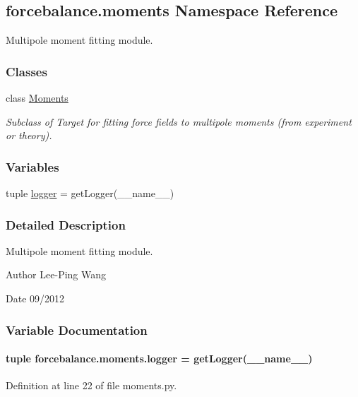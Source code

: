 \hypertarget{namespaceforcebalance_1_1moments}{\subsection{forcebalance.\-moments Namespace Reference}
\label{namespaceforcebalance_1_1moments}
}


Multipole moment fitting module.  


\subsubsection*{Classes}
\begin{DoxyCompactItemize}
\item 
class \hyperlink{classforcebalance_1_1moments_1_1Moments}{Moments}
\begin{DoxyCompactList}\small\item\em Subclass of Target for fitting force fields to multipole moments (from experiment or theory). \end{DoxyCompactList}\end{DoxyCompactItemize}
\subsubsection*{Variables}
\begin{DoxyCompactItemize}
\item 
tuple \hyperlink{namespaceforcebalance_1_1moments_aa122bf257dd3b18da0e9c0a771d688db}{logger} = get\-Logger(\-\_\-\-\_\-name\-\_\-\-\_\-)
\end{DoxyCompactItemize}


\subsubsection{Detailed Description}
Multipole moment fitting module. \begin{DoxyAuthor}{Author}
Lee-\/\-Ping Wang 
\end{DoxyAuthor}
\begin{DoxyDate}{Date}
09/2012 
\end{DoxyDate}


\subsubsection{Variable Documentation}
\hypertarget{namespaceforcebalance_1_1moments_aa122bf257dd3b18da0e9c0a771d688db}{
\paragraph[{logger}]{\setlength{\rightskip}{0pt plus 5cm}tuple forcebalance.\-moments.\-logger = get\-Logger(\-\_\-\-\_\-name\-\_\-\-\_\-)}}\label{namespaceforcebalance_1_1moments_aa122bf257dd3b18da0e9c0a771d688db}


Definition at line 22 of file moments.\-py.

